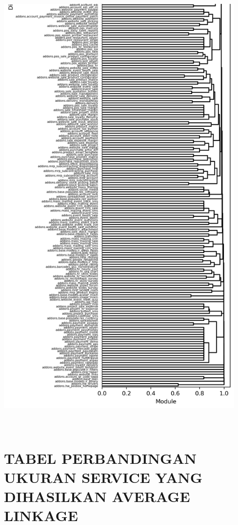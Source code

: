 \begin{center}
  \includegraphics[width=12.5cm]{img/lampiran/average-full-2.png}
  \label{fig:average-full-2}
\end{center}

\chapter{\\ TABEL PERBANDINGAN UKURAN SERVICE YANG DIHASILKAN AVERAGE LINKAGE}

